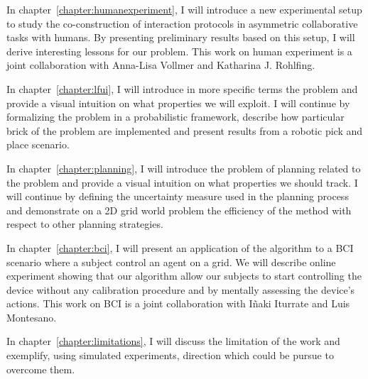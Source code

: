 In chapter~\ref{chapter:humanexperiment}, I will introduce a new experimental setup to study the co-construction of interaction protocols in asymmetric collaborative tasks with humans. By presenting preliminary results based on this setup, I will derive interesting lessons for our problem. This work on human experiment is a joint collaboration with Anna-Lisa Vollmer and Katharina J. Rohlfing. 

In chapter~\ref{chapter:lfui}, I will introduce in more specific terms the problem and provide a visual intuition on what properties we will exploit. I will continue by formalizing the problem in a probabilistic framework, describe how particular brick of the problem are implemented and present results from a robotic pick and place scenario.

In chapter~\ref{chapter:planning}, I will introduce the problem of planning related to the problem and provide a visual intuition on what properties we should track. I will continue by defining the uncertainty measure used in the planning process and demonstrate on a 2D grid world problem the efficiency of the method with respect to other planning strategies.

In chapter~\ref{chapter:bci}, I will present an application of the algorithm to a BCI scenario where a subject control an agent on a grid. We will describe online experiment showing that our algorithm allow our subjects to start controlling the device without any calibration procedure and by mentally assessing the device's actions. This work on BCI is a joint collaboration with I{\~n}aki Iturrate and Luis Montesano.

In chapter~\ref{chapter:limitations}, I will discuss the limitation of the work and exemplify, using simulated experiments, direction which could be pursue to overcome them.

